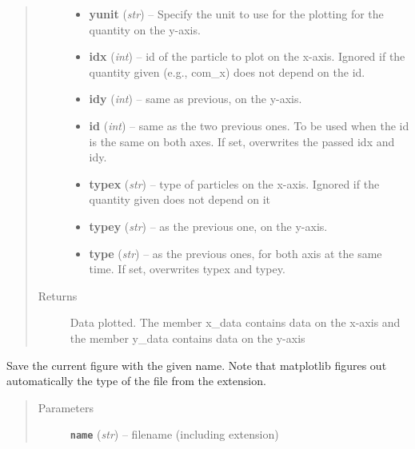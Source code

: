 \documentclass[letterpaper,10pt,english]{sphinxmanual}
\begin{document}
\begin{fulllineitems}
\begin{quote}
\begin{description}
\begin{itemize}
\item {} 
\textbf{yunit} (\emph{str}) --
Specify the unit to use for the plotting for the quantity
on the y-axis.

\item {} 
\textbf{idx} (\emph{int}) --
id of the particle to plot on the x-axis. Ignored if the
quantity given (e.g., com\_x) does not depend on the id.

\item {} 
\textbf{idy} (\emph{int}) --
same as previous, on the y-axis.

\item {} 
\textbf{id} (\emph{int}) --
same as the two previous ones. To be used when the id is the
same on both axes. If set, overwrites the passed idx and idy.

\item {} 
\textbf{typex} (\emph{str}) --
type of particles on the x-axis. Ignored if the quantity
given does not depend on it

\item {} 
\textbf{typey} (\emph{str}) --
as the previous one, on the y-axis.

\item {} 
\textbf{type} (\emph{str}) --
as the previous ones, for both axis at the same time. If set,
overwrites typex and typey.

\end{itemize}

\item[{Returns}] \leavevmode
Data plotted. The member x\_data contains data on the x-axis and the member y\_data
contains data on the y-axis

\end{description}\end{quote}

\end{fulllineitems}


\begin{fulllineitems}
\label{index:facade.savefig}
Save the current figure with the given name.  Note that matplotlib
figures out automatically the type of the file from the extension.
\begin{quote}\begin{description}
\item[{Parameters}] \leavevmode
\textbf{\texttt{name}} (\emph{str}) -- filename (including extension)

\end{description}\end{quote}

\end{fulllineitems}
\end{document}
